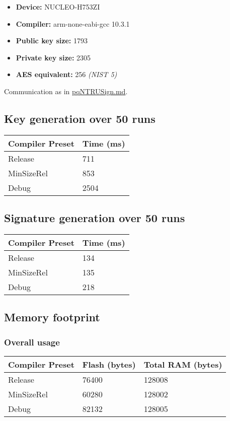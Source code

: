 \documentclass[
]{article}
\providecommand{\tightlist}{%
  \setlength{\itemsep}{0pt}\setlength{\parskip}{0pt}}
\begin{document}
\begin{itemize}
\tightlist
\item
  \textbf{Device:} NUCLEO-H753ZI
\item
  \textbf{Compiler:} arm-none-eabi-gcc 10.3.1
\item
  \textbf{Public key size:} 1793
\item
  \textbf{Private key size:} 2305
\item
  \textbf{AES equivalent:} 256 \textit{(NIST 5)}
\end{itemize}

Communication as in \url{pqNTRUSign.md}.

\hypertarget{key-generation-over-50-runs-1}{%
\subsection{Key generation over 50
runs}\label{key-generation-over-50-runs-1}}

\begin{longtable}[]{@{}ll@{}}
\toprule
Compiler Preset & Time (ms)\tabularnewline
\midrule
\endhead
Release & 711\tabularnewline
MinSizeRel & 853\tabularnewline
Debug & 2504\tabularnewline
\bottomrule
\end{longtable}

\hypertarget{signature-generation-over-50-runs-1}{%
\subsection{Signature generation over 50
runs}\label{signature-generation-over-50-runs-1}}

\begin{longtable}[]{@{}ll@{}}
\toprule
Compiler Preset & Time (ms)\tabularnewline
\midrule
\endhead
Release & 134\tabularnewline
MinSizeRel & 135\tabularnewline
Debug & 218\tabularnewline
\bottomrule
\end{longtable}

\hypertarget{memory-footprint-2}{%
\subsection{Memory footprint}\label{memory-footprint-2}}

\hypertarget{overall-usage-2}{%
\subsubsection{Overall usage}\label{overall-usage-2}}

\begin{longtable}[]{@{}lll@{}}
\toprule
Compiler Preset & Flash (bytes) & Total RAM (bytes)\tabularnewline
\midrule
\endhead
Release & 76400 & 128008\tabularnewline
MinSizeRel & 60280 & 128002\tabularnewline
Debug & 82132 & 128005\tabularnewline
\bottomrule
\end{longtable}
\end{document}
